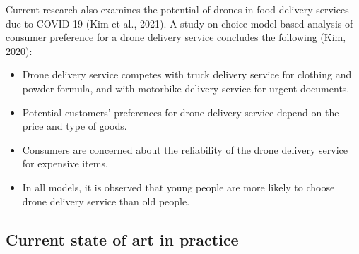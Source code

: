 \documentclass[
]{book}
\providecommand{\tightlist}{%
  \setlength{\itemsep}{0pt}\setlength{\parskip}{0pt}}
\begin{document}
Current research also examines the potential of drones in food delivery services due to COVID-19 (Kim et al., 2021). A study on choice-model-based analysis of consumer preference for a drone delivery service concludes the following (Kim, 2020):

\begin{itemize}
\tightlist
\item
  Drone delivery service competes with truck delivery service for clothing and powder formula, and with motorbike delivery service for urgent documents.
\item
  Potential customers' preferences for drone delivery service depend on the price and type of goods.
\item
  Consumers are concerned about the reliability of the drone delivery service for expensive items.
\item
  In all models, it is observed that young people are more likely to choose drone delivery service than old people.
\end{itemize}

\hypertarget{current-state-of-art-in-practice-24}{%
\subsection*{Current state of art in practice}\label{current-state-of-art-in-practice-24}}
\end{document}
